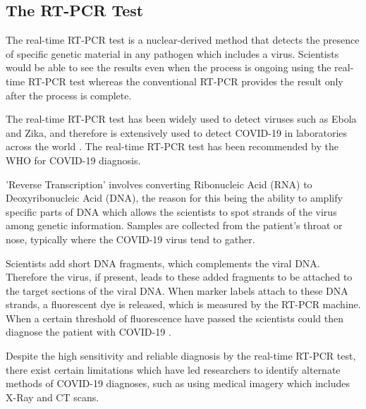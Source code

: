 \subsection{The RT-PCR Test}
The real-time RT-PCR test is a nuclear-derived method that detects the presence of 
specific genetic material in any pathogen which includes a virus. Scientists would be able to see the results even when the process is ongoing
using the real-time RT-PCR test whereas the conventional RT-PCR provides the result 
only after the process is complete. 

The real-time RT-PCR test has been widely used to detect viruses such as Ebola 
and Zika, and therefore is extensively used to detect COVID-19 in 
laboratories across the world \cite{IAEA2020}. The real-time RT-PCR test 
has been recommended by the WHO for COVID-19 diagnosis.

'Reverse Transcription' involves converting Ribonucleic Acid (RNA) to  Deoxyribonucleic Acid (DNA), 
the reason for this being the ability to amplify specific parts of DNA which allows the scientists to 
spot strands of the virus among genetic information. Samples are collected from the patient's 
throat or nose, typically where the COVID-19 virus tend to gather.

Scientists add short DNA fragments, which 
complements the viral DNA. Therefore the virus, if present, 
leads to these added fragments to be attached to the 
target sections of the viral DNA. When marker labels attach to 
these DNA strands, a fluorescent dye is released, which is measured by 
the RT-PCR machine. When a certain threshold of fluorescence have passed the scientists could 
then diagnose the patient with 
COVID-19 \cite{IAEA2020}.

Despite the high sensitivity and reliable diagnosis by the real-time RT-PCR test, 
there exist certain limitations which have led researchers to identify alternate 
methods of COVID-19 diagnoses, such as using medical imagery which 
includes X-Ray and CT scans. 

